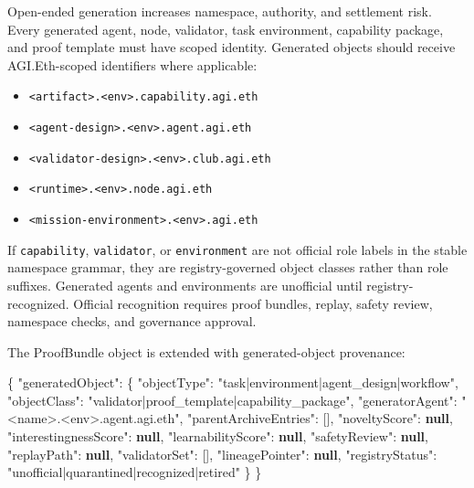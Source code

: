 \documentclass[
  11pt,
]{article}
\newenvironment{Shaded}{}{}
\newcommand{\DataTypeTok}[1]{\textcolor[rgb]{0.56,0.13,0.00}{#1}}
\newcommand{\FunctionTok}[1]{\textcolor[rgb]{0.02,0.16,0.49}{#1}}
\newcommand{\KeywordTok}[1]{\textcolor[rgb]{0.00,0.44,0.13}{\textbf{#1}}}
\newcommand{\OtherTok}[1]{\textcolor[rgb]{0.00,0.44,0.13}{#1}}
\newcommand{\StringTok}[1]{\textcolor[rgb]{0.25,0.44,0.63}{#1}}
\providecommand{\tightlist}{%
  \setlength{\itemsep}{0pt}\setlength{\parskip}{0pt}}
\begin{document}
Open-ended generation increases namespace, authority, and settlement
risk. Every generated agent, node, validator, task environment,
capability package, and proof template must have scoped identity.
Generated objects should receive AGI.Eth-scoped identifiers where
applicable:

\begin{itemize}
\tightlist
\item
  \texttt{\textless{}artifact\textgreater{}.\textless{}env\textgreater{}.capability.agi.eth}
\item
  \texttt{\textless{}agent-design\textgreater{}.\textless{}env\textgreater{}.agent.agi.eth}
\item
  \texttt{\textless{}validator-design\textgreater{}.\textless{}env\textgreater{}.club.agi.eth}
\item
  \texttt{\textless{}runtime\textgreater{}.\textless{}env\textgreater{}.node.agi.eth}
\item
  \texttt{\textless{}mission-environment\textgreater{}.\textless{}env\textgreater{}.agi.eth}
\end{itemize}

If \texttt{capability}, \texttt{validator}, or \texttt{environment} are
not official role labels in the stable namespace grammar, they are
registry-governed object classes rather than role suffixes. Generated
agents and environments are unofficial until registry-recognized.
Official recognition requires proof bundles, replay, safety review,
namespace checks, and governance approval.

The ProofBundle object is extended with generated-object provenance:

\begin{Shaded}
\begin{Highlighting}[]
\FunctionTok{\{}
  \DataTypeTok{"generatedObject"}\FunctionTok{:} \FunctionTok{\{}
    \DataTypeTok{"objectType"}\FunctionTok{:} \StringTok{"task|environment|agent\_design|workflow"}\FunctionTok{,}
    \DataTypeTok{"objectClass"}\FunctionTok{:} \StringTok{"validator|proof\_template|capability\_package"}\FunctionTok{,}
    \DataTypeTok{"generatorAgent"}\FunctionTok{:} \StringTok{"\textless{}name\textgreater{}.\textless{}env\textgreater{}.agent.agi.eth"}\FunctionTok{,}
    \DataTypeTok{"parentArchiveEntries"}\FunctionTok{:} \OtherTok{[]}\FunctionTok{,}
    \DataTypeTok{"noveltyScore"}\FunctionTok{:} \KeywordTok{null}\FunctionTok{,}
    \DataTypeTok{"interestingnessScore"}\FunctionTok{:} \KeywordTok{null}\FunctionTok{,}
    \DataTypeTok{"learnabilityScore"}\FunctionTok{:} \KeywordTok{null}\FunctionTok{,}
    \DataTypeTok{"safetyReview"}\FunctionTok{:} \KeywordTok{null}\FunctionTok{,}
    \DataTypeTok{"replayPath"}\FunctionTok{:} \KeywordTok{null}\FunctionTok{,}
    \DataTypeTok{"validatorSet"}\FunctionTok{:} \OtherTok{[]}\FunctionTok{,}
    \DataTypeTok{"lineagePointer"}\FunctionTok{:} \KeywordTok{null}\FunctionTok{,}
    \DataTypeTok{"registryStatus"}\FunctionTok{:} \StringTok{"unofficial|quarantined|recognized|retired"}
  \FunctionTok{\}}
\FunctionTok{\}}
\end{Highlighting}
\end{Shaded}
\end{document}
